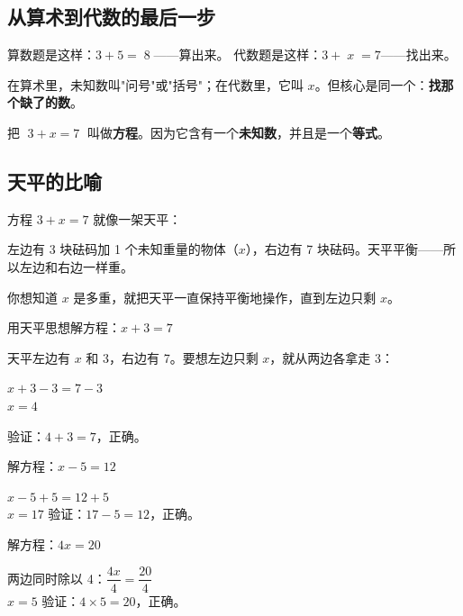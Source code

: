 

\subsection*{从算术到代数的最后一步}

算数题是这样：$3+5=\boxed{\;8\;}$——算出来。
代数题是这样：$3+\boxed{\;x\;}=7$——找出来。

在算术里，未知数叫"问号"或"括号"；在代数里，它叫 $x$。但核心是同一个：\textbf{找那个缺了的数}。

把 $\;3 + x = 7\;$ 叫做\textbf{方程}。因为它含有一个\textbf{未知数}，并且是一个\textbf{等式}。

\subsection*{天平的比喻}

方程 $3+x=7$ 就像一架天平：

左边有 3 块砝码加 1 个未知重量的物体（$x$），右边有 7 块砝码。天平平衡——所以左边和右边一样重。

你想知道 $x$ 是多重，就把天平一直保持平衡地操作，直到左边只剩 $x$。

\begin{example}
用天平思想解方程：$x+3=7$
\end{example}
\begin{solution}
天平左边有 $x$ 和 3，右边有 7。要想左边只剩 $x$，就从两边各拿走 3：

$x+3-3 = 7-3$\\
$x = 4$

验证：$4+3=7$，正确。
\end{solution}

\begin{example}
解方程：$x-5=12$
\end{example}
\begin{solution}
$x-5+5 = 12+5$\\
$x = 17$
验证：$17-5=12$，正确。
\end{solution}

\begin{example}
解方程：$4x = 20$
\end{example}
\begin{solution}
两边同时除以 4：$\dfrac{4x}{4} = \dfrac{20}{4}$\\
$x = 5$
验证：$4\times5=20$，正确。
\end{solution}

